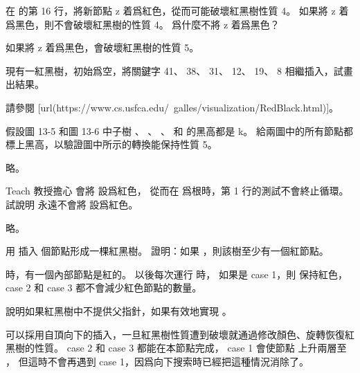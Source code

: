 \startsection[
  title={Insertion},
]

\startEXERCISE
在  的第 16 行，將新節點 z 着爲紅色，從而可能破壞紅黑樹性質 4。
如果將 z 着爲黑色，則不會破壞紅黑樹的性質 4。
爲什麼不將 z 着爲黑色？
\stopEXERCISE

\startANSWER
如果將 z 着爲黑色，會破壞紅黑樹的性質 5。
\stopANSWER

\startEXERCISE
現有一紅黑樹，初始爲空，將關鍵字 41、 38、 31、 12、 19、 8 相繼插入，試畫出結果。
\stopEXERCISE

\startANSWER
請參閱 [url(https://www.cs.usfca.edu/~galles/visualization/RedBlack.html)]。

\externalfigure[output/e13_3_2-1]
\stopANSWER

\startEXERCISE
假設圖 13-5 和圖 13-6 中子樹 \m{\alpha}、 \m{\beta}、 \m{\gamma}、 \m{\delta} 和 \m{\epsilon} 的黑高都是 k。
給兩圖中的所有節點都標上黑高，以驗證圖中所示的轉換能保持性質 5。
\stopEXERCISE

\startANSWER
略。
\stopANSWER

\startEXERCISE
Teach 教授擔心  會將  設爲紅色，
從而在  爲根時，第 1 行的測試不會終止循環。
試說明  永遠不會將  設爲紅色。
\stopEXERCISE

\startANSWER
略。
\stopANSWER

\startEXERCISE
用  插入  個節點形成一棵紅黑樹。
證明：如果 ，則該樹至少有一個紅節點。
\stopEXERCISE

\startANSWER
{} 時，有一個內部節點是紅的。
以後每次運行  時，
如果是 case 1，則  保持紅色，case 2 和 case 3 都不會減少紅色節點的數量。
\stopANSWER

\startEXERCISE
說明如果紅黑樹中不提供父指針，如果有效地實現 。
\stopEXERCISE

\startANSWER
可以採用自頂向下的插入，一旦紅黑樹性質遭到破壞就通過修改顏色、旋轉恢復紅黑樹的性質。
 case 2 和 case 3 都能在本節點完成，
 case 1 會使節點  上升兩層至 ，
但這時不會再遇到 case 1，因爲向下搜索時已經把這種情況消除了。
\stopANSWER

\stopsection
